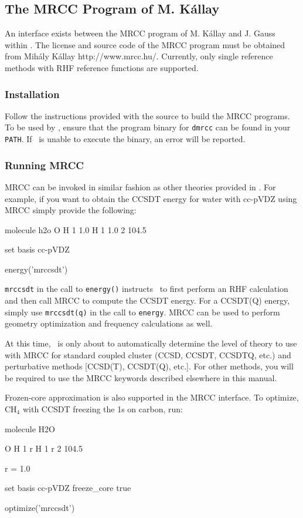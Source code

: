 \subsection{The MRCC Program of M. K\'{a}llay} \label{mrcc}
An interface exists between the MRCC program of M. K\'{a}llay and J. Gauss within \PSIfour.  The license and source code of the MRCC program must be obtained from Mih\'{a}ly K\'{a}llay http://www.mrcc.hu/. Currently, only single reference methods with RHF reference functions are supported.

\subsubsection{Installation}
Follow the instructions provided with the source to build the MRCC programs. To be used by \PSIfour, ensure that the program binary for {\tt dmrcc} can be found in your {\tt PATH}. If \PSIfour\ is unable to execute the binary, an error will be reported.

\subsubsection{Running MRCC}
MRCC can be invoked in similar fashion as other theories provided in \PSIfour. For example, if you want to obtain the CCSDT energy for water with cc-pVDZ using MRCC simply provide the following:

\begin{Snippet}
molecule h2o {
    O
    H 1 1.0
    H 1 1.0 2 104.5
}

set {
    basis cc-pVDZ
}

energy('mrccsdt')
\end{Snippet}

{\tt mrccsdt} in the call to {\tt energy()} instructs \PSIfour\ to first perform an RHF calculation and then call MRCC to compute the CCSDT energy. For a CCSDT(Q) energy, simply use {\tt mrccsdt(q)} in the call to {\tt energy}.  MRCC can be used to perform geometry optimization and frequency calculations as well.

At this time, \PSIfour\ is only about to automatically determine the level of theory to use with MRCC for standard coupled cluster (CCSD, CCSDT, CCSDTQ, etc.) and perturbative methods [CCSD(T), CCSDT(Q), etc.]. For other methods, you will be required to use the MRCC keywords described elsewhere in this manual.

Frozen-core approximation is also supported in the MRCC interface. To optimize, CH$_4$ with CCSDT freezing the 1s on carbon, run:

\begin{Snippet}
molecule H2O {
    O
    H 1 r
    H 1 r 2 104.5

    r = 1.0
}

set {
    basis cc-pVDZ
    freeze_core true
}

optimize('mrccsdt')
\end{Snippet}
